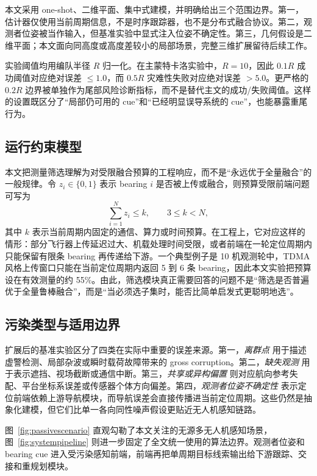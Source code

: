 \documentclass[drones,article,submit,moreauthors]{Definitions/mdpi}
\begin{document}
本文采用 one-shot、二维平面、集中式建模，并明确给出三个范围边界。第一，估计器仅使用当前周期信息，不是时序跟踪器，也不是分布式融合协议。第二，观测者位姿被当作输入，但基准实验中显式注入位姿不确定性。第三，几何假设是二维平面；本文面向同高度或高度差较小的局部场景，完整三维扩展留待后续工作。

实验阈值均用编队半径 $R$ 归一化。在主蒙特卡洛实验中，$R=10$，因此 $0.1R$ 成功阈值对应绝对误差 $\leq 1.0$，而 $0.5R$ 灾难性失败对应绝对误差 $>5.0$。更严格的 $0.2R$ 边界被单独作为尾部风险诊断指标，而不是替代主文的成功/失败阈值。这样的设置既区分了“局部仍可用的 cue”和“已经明显误导系统的 cue”，也能暴露重尾行为。

\subsection{运行约束模型}

本文把测量筛选理解为对受限融合预算的工程响应，而不是“永远优于全量融合”的一般规律。令 $z_i\in\{0,1\}$ 表示 bearing $i$ 是否被上传或融合，则预算受限前端问题可写为
\begin{equation}
\sum_{i=1}^{N} z_i \leq k,\qquad 3 \leq k < N,
\end{equation}
其中 $k$ 表示当前周期内固定的通信、算力或时间预算。在工程上，它对应这样的情形：部分飞行器上传延迟过大、机载处理时间受限，或者前端在一轮定位周期内只能保留有限条 bearing 再传递给下游。一个典型例子是 10 机观测轮中，TDMA 风格上传窗口只能在当前定位周期内返回 5 到 6 条 bearing，因此本文实验把预算设在有效测量的约 55\%。由此，筛选模块真正需要回答的问题不是“筛选是否普遍优于全量鲁棒融合”，而是“当必须选子集时，能否比简单启发式更聪明地选”。

\subsection{污染类型与适用边界}

扩展后的基准实验区分了四类在实际中重要的误差来源。第一，\emph{离群点} 用于描述虚警检测、局部杂波或瞬时载荷故障带来的 gross corruption。第二，\emph{缺失观测} 用于表示遮挡、视场截断或通信中断。第三，\emph{共享或异构偏置} 则对应航向参考失配、平台坐标系误差或传感器个体方向偏差。第四，\emph{观测者位姿不确定性} 表示定位前端依赖上游导航模块，而导航误差会直接传播进当前定位周期。这些仍然是抽象化建模，但它们比单一各向同性噪声假设更贴近无人机感知链路。

图~\ref{fig:passivescenario} 直观勾勒了本文关注的无源多无人机感知场景，图~\ref{fig:systempipeline} 则进一步固定了全文统一使用的算法边界。观测者位姿和 bearing cue 进入受污染感知前端，前端再把单周期目标线索输出给下游跟踪、交接和重规划模块。
\end{document}
